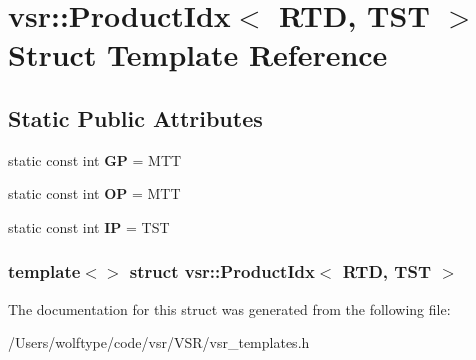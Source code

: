\hypertarget{structvsr_1_1_product_idx_3_01_r_t_d_00_01_t_s_t_01_4}{\section{vsr\-:\-:Product\-Idx$<$ R\-T\-D, T\-S\-T $>$ Struct Template Reference}
\label{structvsr_1_1_product_idx_3_01_r_t_d_00_01_t_s_t_01_4}
}
\subsection*{Static Public Attributes}
\begin{DoxyCompactItemize}
\item 
\hypertarget{structvsr_1_1_product_idx_3_01_r_t_d_00_01_t_s_t_01_4_a0fea476e10c96d052c8e7681be6e9d3e}{static const int {\bfseries G\-P} = M\-T\-T}\label{structvsr_1_1_product_idx_3_01_r_t_d_00_01_t_s_t_01_4_a0fea476e10c96d052c8e7681be6e9d3e}

\item 
\hypertarget{structvsr_1_1_product_idx_3_01_r_t_d_00_01_t_s_t_01_4_a59b6b9690642824d9ba7b90e3621be7e}{static const int {\bfseries O\-P} = M\-T\-T}\label{structvsr_1_1_product_idx_3_01_r_t_d_00_01_t_s_t_01_4_a59b6b9690642824d9ba7b90e3621be7e}

\item 
\hypertarget{structvsr_1_1_product_idx_3_01_r_t_d_00_01_t_s_t_01_4_a38b8e1f8660282f8502512eebb4d0d77}{static const int {\bfseries I\-P} = T\-S\-T}\label{structvsr_1_1_product_idx_3_01_r_t_d_00_01_t_s_t_01_4_a38b8e1f8660282f8502512eebb4d0d77}

\end{DoxyCompactItemize}
\subsubsection*{template$<$$>$ struct vsr\-::\-Product\-Idx$<$ R\-T\-D, T\-S\-T $>$}



The documentation for this struct was generated from the following file\-:\begin{DoxyCompactItemize}
\item 
/\-Users/wolftype/code/vsr/\-V\-S\-R/vsr\-\_\-templates.\-h\end{DoxyCompactItemize}
